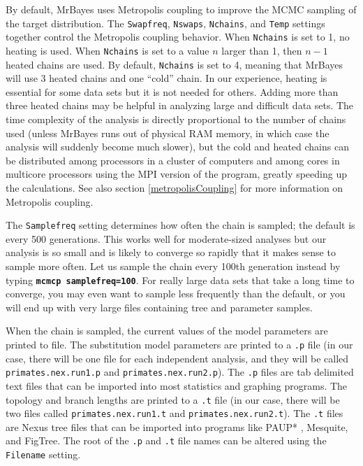 \documentclass[12pt]{book}
\newcommand{\ttt}[1]{\texttt{#1}}
\newcommand{\tb}[1]{\ttt{\textbf{#1}}}
\begin{document}
By default, MrBayes uses Metropolis coupling to improve the MCMC sampling of the target
distribution. The \ttt{Swapfreq}, \ttt{Nswaps}, \ttt{Nchains}, and \ttt{Temp} settings together
control the Metropolis coupling behavior. When \ttt{Nchains} is set to 1, no heating is used. When
\ttt{Nchains} is set to a value $n$ larger than 1, then $n - 1$ heated chains are used. By default,
\ttt{Nchains} is set to 4, meaning that MrBayes will use 3 heated chains and one ``cold'' chain. In
our experience, heating is essential for some data sets but it is not needed for others. Adding
more than three heated chains may be helpful in analyzing large and difficult data sets. The time
complexity of the analysis is directly proportional to the number of chains used (unless MrBayes
runs out of physical RAM memory, in which case the analysis will suddenly become much slower), but
the cold and heated chains can be distributed among processors in a cluster of computers and among
cores in multicore processors using the MPI version of the program, greatly speeding up the
calculations. See also section \ref{metropolisCoupling} for more information on Metropolis coupling.

The \ttt{Samplefreq} setting determines how often the chain is sampled; the default is every 500
generations. This works well for moderate-sized analyses but our analysis is so small and is likely
to converge so rapidly that it makes sense to sample more often. Let us sample the chain every
100th generation instead by typing \tb{mcmcp samplefreq=100}. For really large data sets that take
a long time to converge, you may even want to sample less frequently than the default, or you will
end up with very large files containing tree and parameter samples.

When the chain is sampled, the current values of the model parameters are printed to file. The
substitution model parameters are printed to a \ttt{.p} file (in our case, there will be one file
for each independent analysis, and they will be called \ttt{primates.nex.run1.p} and
\ttt{primates.nex.run2.p}). The \ttt{.p} files are tab delimited text files that can be imported
into most statistics and graphing programs. The topology and branch lengths are printed to a
\ttt{.t} file (in our case, there will be two files called \ttt{primates.nex.run1.t} and
\ttt{primates.nex.run2.t}). The \ttt{.t} files are Nexus tree files that can be imported into
programs like PAUP* \citep{swofford98}, Mesquite, and FigTree. The root of the \ttt{.p} and
\ttt{.t} file names can be altered using the \ttt{Filename} setting.
\end{document}
